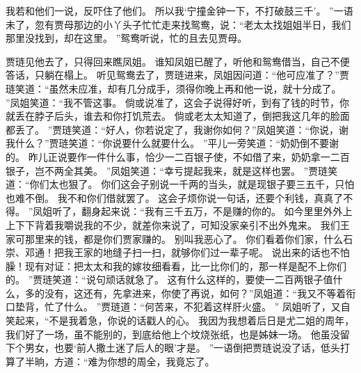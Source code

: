 我若和他们一说，反吓住了他们。
所以我‘宁撞金钟一下，不打破鼓三千’。
”一语未了，忽有贾母那边的小丫头子忙忙走来找鸳鸯，说：“老太太找姐姐半日，我们那里没找到，却在这里。
”鸳鸯听说，忙的且去见贾母。
\par
贾琏见他去了，只得回来瞧凤姐。
谁知凤姐已醒了，听他和鸳鸯借当，自己不便答话，只躺在榻上。
听见鸳鸯去了，贾琏进来，凤姐因问道：“他可应准了？”贾琏笑道：“虽然未应准，却有几分成手，须得你晚上再和他一说，就十分成了。
”凤姐笑道：“我不管这事。
倘或说准了，这会子说得好听，到有了钱的时节，你就丢在脖子后头，谁去和你打饥荒去。
倘或老太太知道了，倒把我这几年的脸面都丢了。
”贾琏笑道：“好人，你若说定了，我谢你如何？”凤姐笑道：“你说，谢我什么？”贾琏笑道：“你说要什么就要什么。
”平儿一旁笑道：“奶奶倒不要谢的。
昨儿正说要作一件什么事，恰少一二百银子使，不如借了来，奶奶拿一二百银子，岂不两全其美。
”凤姐笑道：“幸亏提起我来，就是这样也罢。
”贾琏笑道：“你们太也狠了。
你们这会子别说一千两的当头，就是现银子要三五千，只怕也难不倒。
我不和你们借就罢了。
这会子烦你说一句话，还要个利钱，真真了不得。
”凤姐听了，翻身起来说：“我有三千五万，不是赚的你的。
如今里里外外上上下下背着我嚼说我的不少，就差你来说了，可知没家亲引不出外鬼来。
我们王家可那里来的钱，都是你们贾家赚的。
别叫我恶心了。
你们看着你们家，什么石崇、邓通！把我王家的地缝子扫一扫，就够你们过一辈子呢。
说出来的话也不怕臊！现有对证：把太太和我的嫁妆细看看，比一比你们的，那一样是配不上你们的。
”贾琏笑道：“说句顽话就急了。
这有什么这样的，要使一二百两银子值什么，多的没有，这还有，先拿进来，你使了再说，如何？”凤姐道：“我又不等着衔口垫背，忙了什么。
”贾琏道：“何苦来，不犯着这样肝火盛。
”
凤姐听了，又自笑起来，“不是我着急，你说的话戳人的心。
我因为我想着后日是尤二姐的周年，我们好了一场，虽不能别的，到底给他上个坟烧张纸，也是姊妹一场。
他虽没留下个男女，也要‘前人撒土迷了后人的眼’才是。
”一语倒把贾琏说没了话，低头打算了半晌，方道：“难为你想的周全，我竟忘了。
